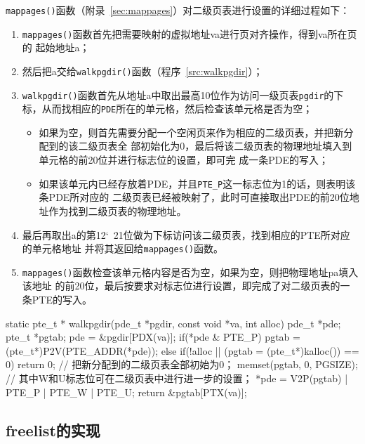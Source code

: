\documentclass{swfuthesism}
\begin{document}
\texttt{mappages()}函数（附录~\ref{sec:mappages}）对二级页表进行设置的详细过程如下：
\begin{enumerate}
\item \texttt{mappages()}函数首先把需要映射的虚拟地址va进行页对齐操作，得到va所在页的
  起始地址a；
\item 然后把a交给\texttt{walkpgdir()}函数（程序~\ref{src:walkpgdir}）；
\item \texttt{walkpgdir()}函数首先从地址a中取出最高10位作为访问一级页表\texttt{pgdir}的下
  标，从而找相应的\texttt{PDE}所在的单元格，然后检查该单元格是否为空；
  \begin{itemize}
  \item 如果为空，则首先需要分配一个空闲页来作为相应的二级页表，并把新分配到的该二级页表全
    部初始化为0，最后将该二级页表的物理地址填入到单元格的前20位并进行标志位的设置，即可完
    成一条PDE的写入；
  \item 如果该单元内已经存放着PDE，并且\verb|PTE_P|这一标志位为1的话，则表明该条PDE所对应的
    二级页表已经被映射了，此时可直接取出PDE的前20位地址作为找到二级页表的物理地址。
  \end{itemize}
\item 最后再取出a的第12\char`~21位做为下标访问该二级页表，找到相应的PTE所对应的单元格地址
  并将其返回给\texttt{mappages()}函数。
\item \texttt{mappages()}函数检查该单元格内容是否为空，如果为空，则把物理地址pa填入该地址
  的前20位，最后按要求对标志位进行设置，即完成了对二级页表的一条PTE的写入。
\end{enumerate}

\begin{listing}%
  \begin{codeblock}
\begin{ccode}
static pte_t *
walkpgdir(pde_t *pgdir, const void *va, int alloc)
{
  pde_t *pde;
  pte_t *pgtab;
  pde = &pgdir[PDX(va)];
  if(*pde & PTE_P){
    pgtab = (pte_t*)P2V(PTE_ADDR(*pde));
  }
  else {
    if(!alloc || (pgtab = (pte_t*)kalloc()) == 0)
      return 0;
    // 把新分配到的二级页表全部初始为0；
    memset(pgtab, 0, PGSIZE);
    // 其中W和U标志位可在二级页表中进行进一步的设置；
    *pde = V2P(pgtab) | PTE_P | PTE_W | PTE_U;
  }
  return &pgtab[PTX(va)];
}
\end{ccode}
  \end{codeblock}
  \label{src:walkpgdir}
\end{listing}

\subsection{freelist的实现}
\end{document}
